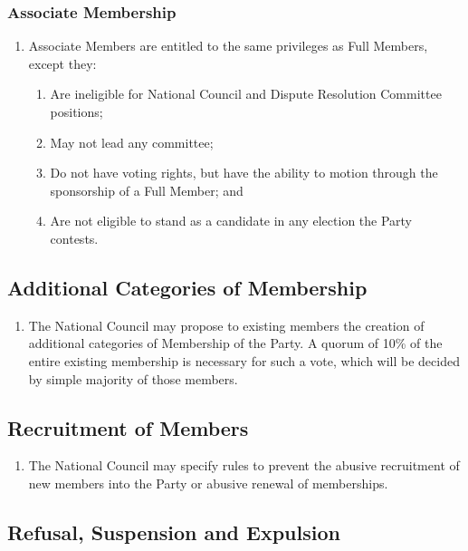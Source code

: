 \documentclass[a4paper,titlepage,8.5pt]{article}
\begin{document}
\subsubsection{Associate Membership}

\begin{enumerate}
\item Associate Members are entitled to the same privileges as Full Members, except they:
\begin{enumerate}
\item Are ineligible for National Council and Dispute Resolution Committee positions;
\item May not lead any committee;
\item Do not have voting rights, but have the ability to motion through the sponsorship of a Full Member; and
\item Are not eligible to stand as a candidate in any election the Party contests.
\end{enumerate}
\end{enumerate}

\subsection{Additional Categories of Membership}

\begin{enumerate}
\item The National Council may propose to existing members the creation of additional categories of Membership of the Party. A quorum of 10\% of the entire existing membership is necessary for such a vote, which will be decided by simple majority of those members.
\end{enumerate}

\subsection{Recruitment of Members}

\begin{enumerate}
\item The National Council may specify rules to prevent the abusive recruitment of new members into the Party or abusive renewal of memberships.
\end{enumerate}

\subsection{Refusal, Suspension and Expulsion}
\end{document}
